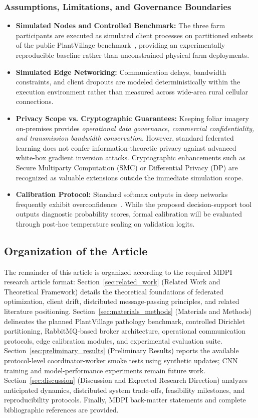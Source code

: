 \documentclass[applsci,article,submit,oneauthor,pdftex]{Definitions/mdpi}
\begin{document}
\subsubsection{Assumptions, Limitations, and Governance Boundaries}
\begin{itemize}[leftmargin=*]
    \item \textbf{Simulated Nodes and Controlled Benchmark:} The three farm participants are executed as simulated client processes on partitioned subsets of the public PlantVillage benchmark~\cite{mohanty2016using}, providing an experimentally reproducible baseline rather than unconstrained physical farm deployments.
    \item \textbf{Simulated Edge Networking:} Communication delays, bandwidth constraints, and client dropouts are modeled deterministically within the execution environment rather than measured across wide-area rural cellular connections.
    \item \textbf{Privacy Scope vs. Cryptographic Guarantees:} Keeping foliar imagery on-premises provides \textit{operational data governance, commercial confidentiality, and transmission bandwidth conservation}. However, standard federated learning does not confer information-theoretic privacy against advanced white-box gradient inversion attacks. Cryptographic enhancements such as Secure Multiparty Computation (SMC) or Differential Privacy (DP) are recognized as valuable extensions outside the immediate simulation scope.
    \item \textbf{Calibration Protocol:} Standard softmax outputs in deep networks frequently exhibit overconfidence~\cite{guo2017calibration}. While the proposed decision-support tool outputs diagnostic probability scores, formal calibration will be evaluated through post-hoc temperature scaling on validation logits.
\end{itemize}

\subsection{Organization of the Article}
The remainder of this article is organized according to the required MDPI research article format: Section~\ref{sec:related_work} (Related Work and Theoretical Framework) details the theoretical foundations of federated optimization, client drift, distributed message-passing principles, and related literature positioning. Section~\ref{sec:materials_methods} (Materials and Methods) delineates the planned PlantVillage pathology benchmark, controlled Dirichlet partitioning, RabbitMQ-based broker architecture, operational communication protocols, edge calibration modules, and experimental evaluation suite. Section~\ref{sec:preliminary_results} (Preliminary Results) reports the available protocol-level coordinator-worker smoke tests using synthetic updates; CNN training and model-performance experiments remain future work. Section~\ref{sec:discussion} (Discussion and Expected Research Direction) analyzes anticipated dynamics, distributed system trade-offs, feasibility milestones, and reproducibility protocols. Finally, MDPI back-matter statements and complete bibliographic references are provided.
\end{document}

